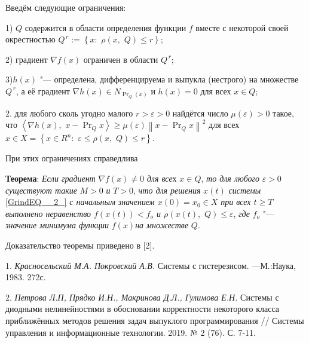 Введём следующие ограничения:

1) $Q$ содержится в области определения функции $f$ вместе с некоторой своей окрестностью $Q^{\, r} :=\left\{x:\, \, \rho \left(x,\, \, Q\right)\le r\right\}$;

2) градиент $\nabla f\left(x\right)$ ограничен в области $Q^{\, r} $;

3)$h\left(x\right)$ "--- определена, дифференцируема и выпукла (нестрого) на множестве \textit{$Q^{\, r} $}, а её градиент $\nabla h\left(x\right)\in N_{\Pr _{Q} \left(x\right)} $ и $h\left(x\right)=0$ для всех $x\in Q$;

2. для любого сколь угодно малого \textit{$r>\varepsilon >0$} найдётся число $\mu \left(\varepsilon \right)>0$ такое, что $\left\langle \nabla h\left(x\right),\, \, x-\Pr _{Q} x\right\rangle \ge \mu \left(\varepsilon \right)\left\| x-\Pr _{Q} x\right\| ^{2} $ для всех $x\in X=\left\{x\in R^{n} :\, \, \varepsilon \le \rho \left(x,\, \, Q\right)\le r\right\}$.

При этих ограничениях справедлива

\textbf{Теорема}: \textit{Если градиент }$\nabla f\left(x\right)\ne 0$\textit{ для все}х $x\in Q$, \textit{то для любого }$\varepsilon >0$\textit{ существуют такие }$M>0$\textit{ и }$T>0$, \textit{что для решения }$x\left(t\right)$\textit{ системы }\eqref{GrindEQ__2_}\textit{ с начальным значением $x\left(0\right)=x_{0} \in X$ при всех $t\ge T$ выполнено неравенство $f\left(x\left(t\right)\right)<f_{o} $ и $\rho \left(x\left(t\right),\, \, Q\right)\le \varepsilon $}, \textit{где }$f_{o} $ "--- \textit{значение минимума функции }$f\left(x\right)$\textit{на множестве }$Q$.

 Доказательство теоремы приведено в [2].

\litlist

1.
{\it Красносельский М.А. Покровский А.В.} Системы с гистерезисом. ---М.:Наука, 1983. 272с.

2.
{\it  Петрова Л.П, Прядко И.Н., Макринова Д.Л., Гулимова Е.Н.} Системы с диодными нелинейностями в обосновании корректности некоторого класса приближённых методов решения задач выпуклого программирования  // Системы управления и информационные технологии. 2019. № 2 (76). С. 7-11.


